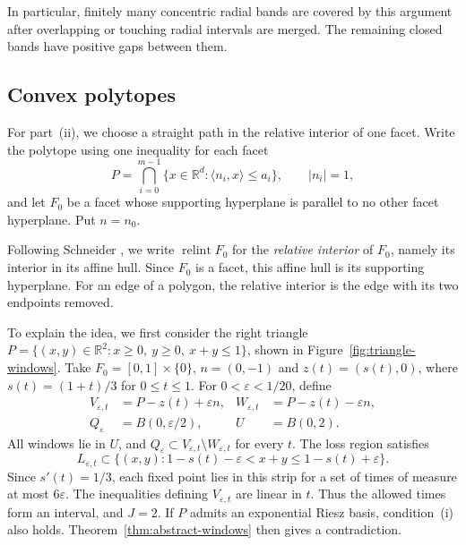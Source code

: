 \documentclass[10pt,a4paper]{amsart}
\def\R{\mathbb{R}}
\newcommand\inpro[2]{\langle #1,#2\rangle}
\newcommand\1{\mathbbm{1}}
\newcommand{\eps}{\varepsilon}
\begin{document}
In particular, finitely many concentric radial bands are covered by this
argument after overlapping or touching radial intervals are merged.
The remaining closed bands have positive gaps between them.

\subsection{Convex polytopes}

For part~(ii), we choose a straight path in the relative interior of one
facet. Write the polytope using one inequality for each facet
\begin{equation*}
    P=\bigcap_{i=0}^{m-1}\{x\in\R^d:\inpro{n_i}{x}\le a_i\},
    \qquad |n_i|=1,
\end{equation*}
and let $F_0$ be a facet whose supporting hyperplane is parallel to no other
facet hyperplane. Put $n=n_0$.

Following Schneider \cite{Sch14}, we write
$\operatorname{relint}F_0$ for the \emph{relative interior} of $F_0$,
namely its interior in its affine hull. Since $F_0$ is a facet, this affine
hull is its supporting hyperplane. For an edge of a polygon, the relative
interior is the edge with its two endpoints removed.

To explain the idea, we first consider the right triangle
$P=\{(x,y)\in\R^2:x\ge0,\ y\ge0,\ x+y\le1\}$,
shown in Figure~\ref{fig:triangle-windows}.
Take $F_0=[0,1]\times\{0\}$, $n=(0,-1)$ and
$z(t)=(s(t),0)$, where $s(t)=(1+t)/3$ for $0\le t\le1$.
For $0<\eps<1/20$, define
\begin{equation*}
    \begin{aligned}
        V_{\eps,t}&=P-z(t)+\eps n,
        &W_{\eps,t}&=P-z(t)-\eps n,\\
        Q_\eps&=B(0,\eps/2),
        &U&=B(0,2).
    \end{aligned}
\end{equation*}
All windows lie in $U$, and $Q_\eps\subset V_{\eps,t}\setminus W_{\eps,t}$
for every $t$. The loss region satisfies
\begin{equation*}
    L_{\eps,t}\subset
    \{(x,y):1-s(t)-\eps<x+y\le1-s(t)+\eps\}.
\end{equation*}
Since $s'(t)=1/3$, each fixed point lies in this strip for a set of times
of measure at most $6\eps$.
The inequalities defining $V_{\eps,t}$ are linear in $t$.
Thus the allowed times form an interval, and $J=2$.
If $P$ admits an exponential Riesz basis, condition~(i) also holds.
Theorem~\ref{thm:abstract-windows} then gives a contradiction.
\end{document}
